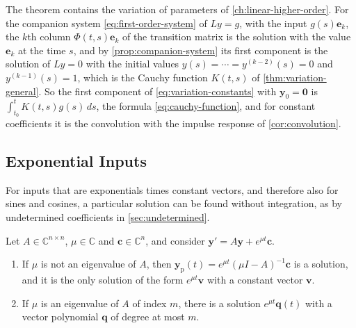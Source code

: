 The theorem contains the variation of parameters of \cref{ch:linear-higher-order}. For the companion system \eqref{eq:first-order-system} of $Ly=g$, with the input $g(s)\mathbf e_k$, the $k$th column $\Phi(t,s)\mathbf e_k$ of the transition matrix is the solution with the value $\mathbf e_k$ at the time $s$, and by \cref{prop:companion-system} its first component is the solution of $Ly=0$ with the initial values $y(s)=\cdots=y^{(k-2)}(s)=0$ and $y^{(k-1)}(s)=1$, which is the Cauchy function $K(t,s)$ of \cref{thm:variation-general}. So the first component of \eqref{eq:variation-constants} with $\mathbf y_0=\mathbf 0$ is $\int_{t_0}^tK(t,s)g(s)\,ds$, the formula \eqref{eq:cauchy-function}, and for constant coefficients it is the convolution with the impulse response of \cref{cor:convolution}.

\subsection{Exponential Inputs}

For inputs that are exponentials times constant vectors, and therefore also for sines and cosines, a particular solution can be found without integration, as by undetermined coefficients in \cref{sec:undetermined}.

\begin{theorem}
\label{thm:exponential-inputs}
Let $A\in\mathbb C^{n\times n}$, $\mu\in\mathbb C$ and $\mathbf c\in\mathbb C^n$, and consider $\mathbf y'=A\mathbf y+e^{\mu t}\mathbf c$.
\begin{enumerate}
\item If $\mu$ is not an eigenvalue of $A$, then $\mathbf y_{\mathrm p}(t)=e^{\mu t}(\mu I-A)^{-1}\mathbf c$ is a solution, and it is the only solution of the form $e^{\mu t}\mathbf v$ with a constant vector $\mathbf v$.
\item If $\mu$ is an eigenvalue of $A$ of index $m$, there is a solution $e^{\mu t}\mathbf q(t)$ with a vector polynomial $\mathbf q$ of degree at most $m$.
\end{enumerate}
\end{theorem}

